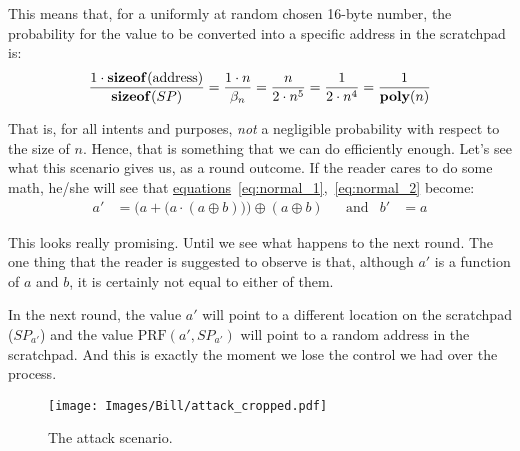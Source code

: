 This means that, for a uniformly at random chosen 16-byte number, the probability for the value to be converted into a specific address in the scratchpad is:
\begin{equation} \nonumber
  \frac{1 \cdot \mbox{\textbf{sizeof}}(\mbox{address})}{\mbox{\textbf{sizeof}}(SP)} =
  \frac{1 \cdot n}{\beta_n} = \frac{n}{2 \cdot n^5} = \frac{1}{2 \cdot n^4} = \frac{1}{\mbox{\textbf{poly}}(n)}
\end{equation}

That is, for all intents and purposes, \emph{not} a negligible probability with respect to the size of $n$. Hence, that is something that we can do efficiently enough. Let's see what this scenario gives us, as a round outcome. If the reader cares to do some math, he/she will see that \hyperref[eq:normal_1]{equations}~\ref{eq:normal_1},~\ref{eq:normal_2} become:
\begin{align} \nonumber
  a' &= \Big( a + \big( a \cdot (a \oplus b) \big) \Big) \oplus (a \oplus b) &
  &\mbox{and} & b' &= a
\end{align}

This looks really promising. Until we see what happens to the next round. The one thing that the reader is suggested to observe is that, although $a'$ is a function of $a$ and $b$, it is certainly not equal to either of them.

In the next round, the value $a'$ will point to a different location on the scratchpad ($SP_{a'}$) and the value $\mbox{PRF}(a', SP_{a'})$ will point to a random address in the scratchpad. And this is exactly the moment we lose the control we had over the process.
\clearpage

\begin{figure}[H]
  \centering
  \texttt{[image: Images/Bill/attack\_cropped.pdf]}
  \caption{The attack scenario.~\cite{bill}}
  \label{fig:attack}
\end{figure}

